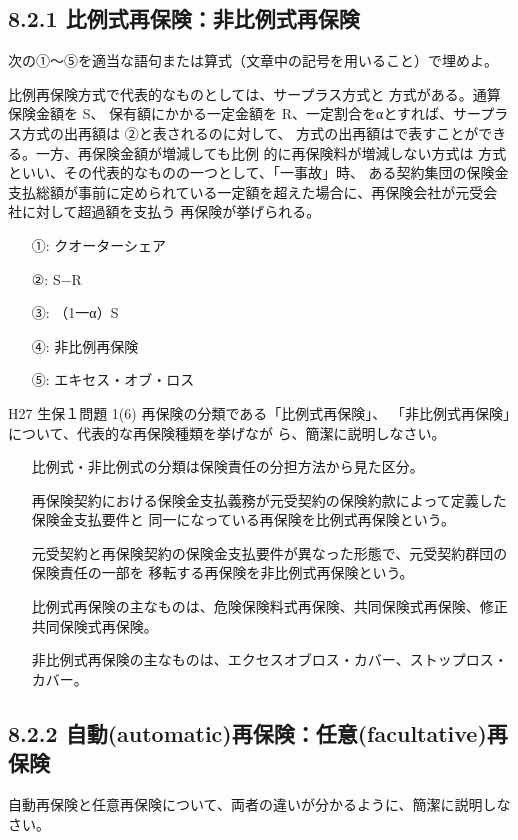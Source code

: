 \documentclass[report,gutter=10mm,fore-edge=10mm,uplatex,dvipdfmx]{jlreq}
\begin{document}
\subsection{8.2.1 比例式再保険：非比例式再保険}
次の①～⑤を適当な語句または算式（文章中の記号を用いること）で埋めよ。

比例再保険方式で代表的なものとしては、サープラス方式と
方式がある。通算保険金額を S、
保有額にかかる一定金額を R、一定割合をαとすれば、サープラス方式の出再額は
②と表されるのに対して、
方式の出再額はで表すことができる。一方、再保険金額が増減しても比例
的に再保険料が増減しない方式は
方式といい、その代表的なものの一つとして、「一事故」時、
ある契約集団の保険金支払総額が事前に定められている一定額を超えた場合に、再保険会社が元受会
社に対して超過額を支払う
再保険が挙げられる。
\answer{}
\begin{itemize}
\item[①: ] クオーターシェア
\item[②: ] S−R
\item[③: ] （1一α）S
\item[④: ] 非比例再保険
\item[⑤: ] エキセス・オブ・ロス
\end{itemize}

\problem{}H27 生保１問題 1(6)
再保険の分類である「比例式再保険」、
「非比例式再保険」について、代表的な再保険種類を挙げなが
ら、簡潔に説明しなさい。
\answer{}
\begin{itemize}
\item[] 比例式・非比例式の分類は保険責任の分担方法から見た区分。
\item[] 再保険契約における保険金支払義務が元受契約の保険約款によって定義した保険金支払要件と
同一になっている再保険を比例式再保険という。
\item[] 元受契約と再保険契約の保険金支払要件が異なった形態で、元受契約群団の保険責任の一部を
移転する再保険を非比例式再保険という。
\item[] 比例式再保険の主なものは、危険保険料式再保険、共同保険式再保険、修正共同保険式再保険。
\item[] 非比例式再保険の主なものは、エクセスオブロス・カバー、ストップロス・カバー。
\end{itemize}

\subsection{8.2.2 自動(automatic)再保険：任意(facultative)再保険}
自動再保険と任意再保険について、両者の違いが分かるように、簡潔に説明しなさい。
\end{document}
